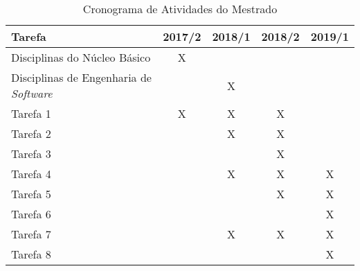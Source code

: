 \documentclass[qualidr]{eesc}
\begin{document}
\begin{table}[!htpb]
	\centering
	\caption{Cronograma de Atividades do Mestrado}
	\begin{center}
		\begin{tabular}{|l|c|c|c|c|}
			\hline
			Tarefa  &2017/2   &2018/1 &2018/2 &2019/1   \\
			\hline\hline
			Disciplinas do Núcleo Básico &X & & & \\
			\hline
			Disciplinas de Engenharia de \textit{Software} & &X & &  \\
			\hline
			Tarefa 1 &X &X &X &  \\
			\hline
			Tarefa 2 & &X &X &  \\
			\hline
			Tarefa 3 & & &X &  \\
			\hline
			Tarefa 4 & &X &X &X  \\
			\hline
			Tarefa 5 & & &X &X  \\
			\hline
			Tarefa 6 & & & &X  \\
			\hline
			Tarefa 7 & &X &X &X  \\
			\hline
			Tarefa 8 & & & &X  \\
			\hline
		\end{tabular}
		\label{tab:cronograma2}
	\end{center}
\end{table} 











\makeatletter
\renewcommand\@biblabel[1]{{\parbox{0.8cm}{[#1]}}}
\makeatother

%

% 



\end{document}
